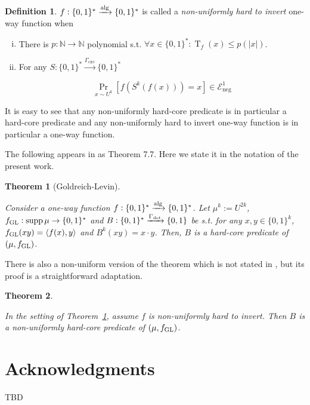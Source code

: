 \documentclass{article}
\numberwithin{equation}{section}
\theoremstyle{definition}
\newtheorem{definition}{Definition}[section]
\theoremstyle{plain}
\newtheorem{theorem}{Theorem}[section]
\newcommand{\Words}{{\{ 0, 1 \}^*}}
\newcommand{\WordsLen}[1]{{\{ 0, 1 \}^{#1}}}
\newcommand{\Bool}{\{0,1\}}
\DeclareMathOperator{\Supp}{supp}
\DeclareMathOperator{\Prb}{Pr}
\DeclareMathOperator{\T}{T}
\newcommand{\Nats}{\mathbb{N}}
\newcommand{\Abs}[1]{\lvert #1 \rvert}
\newcommand{\Chev}[1]{\langle #1 \rangle}
\newcommand{\Fall}{\mathcal{E}}
\newcommand{\Alg}{\xrightarrow{\textnormal{alg}}}
\begin{document}
\begin{samepage}
\begin{definition}

$f: \Words \Alg \Words$ is called a \emph{non-uniformly hard to invert} one-way function
when

\begin{enumerate}[(i)]

\item There is $p: \Nats \rightarrow \Nats$ polynomial s.t. $\forall x \in \Words: \T_f(x) \leq p(\Abs{x})$.

\item For any $S: \Words \xrightarrow{\Gamma_{\text{circ}}} \Words$

\begin{equation}
\Prb_{x \sim U^k}[f(S^k(f(x)))=x] \in \Fall_{\text{neg}}^1
\end{equation}

\end{enumerate}

\end{definition}
\end{samepage}

It is easy to see that any non-uniformly hard-core predicate is in particular a hard-core predicate and any non-uniformly hard to invert one-way function is in particular a one-way function.

The following appears in \cite{Goldreich_2008} as Theorem 7.7. Here we state it in the notation of the present work.

\begin{theorem}[Goldreich-Levin]
\label{thm:goldreich_levin}

Consider a one-way function ${f: \Words \Alg \Words}$. Let $\mu^k:=U^{2k}$, $f_{\textnormal{GL}}: \Supp \mu \rightarrow \Words$ and ${B: \Words \xrightarrow{\Gamma_{\textnormal{det}}} \Bool}$ be s.t. for any $x,y \in \WordsLen{k}$, $f_{\textnormal{GL}}(xy)=\Chev{f(x),y}$ and ${B^k(xy)=x \cdot y}$. Then, $B$ is a hard-core predicate of $(\mu, f_{\textnormal{GL}})$.

\end{theorem}

There is also a non-uniform version of the theorem which is not stated in \cite{Goldreich_2008}, but its proof is a straightforward adaptation.

\begin{theorem}
\label{thm:goldreich_levin_circ}

In the setting of Theorem~\ref{thm:goldreich_levin}, assume $f$ is non-uniformly hard to invert. Then $B$ is a non-uniformly hard-core predicate of $(\mu, f_{\textnormal{GL}})$.
\end{theorem}

\section*{Acknowledgments}

TBD



\end{document}
